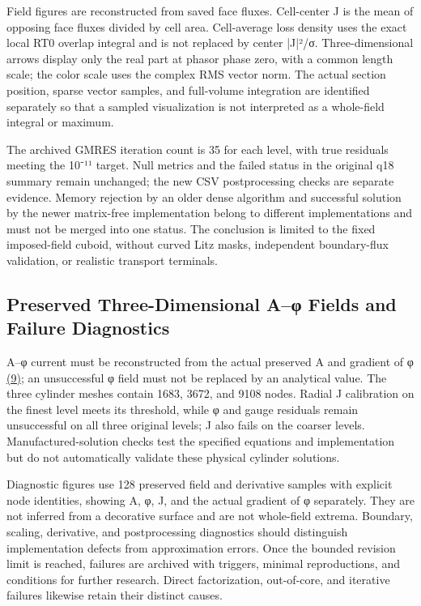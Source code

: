 \documentclass[journal,10pt]{IEEEtran}
\begin{document}
Field figures are reconstructed from saved face fluxes. Cell-center J is the mean of opposing face fluxes divided by cell area. Cell-average loss density uses the exact local RT0 overlap integral and is not replaced by center |J|²/σ. Three-dimensional arrows display only the real part at phasor phase zero, with a common length scale; the color scale uses the complex RMS vector norm. The actual section position, sparse vector samples, and full-volume integration are identified separately so that a sampled visualization is not interpreted as a whole-field integral or maximum.


The archived GMRES iteration count is 35 for each level, with true residuals meeting the 10⁻¹¹ target. Null metrics and the failed status in the original q18 summary remain unchanged; the new CSV postprocessing checks are separate evidence. Memory rejection by an older dense algorithm and successful solution by the newer matrix-free implementation belong to different implementations and must not be merged into one status. The conclusion is limited to the fixed imposed-field cuboid, without curved Litz masks, independent boundary-flux validation, or realistic transport terminals.


\subsection*{Preserved Three-Dimensional A–φ Fields and Failure Diagnostics}
\hypertarget{S2.aphi.heading}{}
A–φ current must be reconstructed from the actual preserved A and gradient of φ \href{paper_en_ieee.pdf#E07}{(9)}; an unsuccessful φ field must not be replaced by an analytical value. The three cylinder meshes contain 1683, 3672, and 9108 nodes. Radial J calibration on the finest level meets its threshold, while φ and gauge residuals remain unsuccessful on all three original levels; J also fails on the coarser levels. Manufactured-solution checks test the specified equations and implementation but do not automatically validate these physical cylinder solutions.


Diagnostic figures use 128 preserved field and derivative samples with explicit node identities, showing A, φ, J, and the actual gradient of φ separately. They are not inferred from a decorative surface and are not whole-field extrema. Boundary, scaling, derivative, and postprocessing diagnostics should distinguish implementation defects from approximation errors. Once the bounded revision limit is reached, failures are archived with triggers, minimal reproductions, and conditions for further research. Direct factorization, out-of-core, and iterative failures likewise retain their distinct causes.
\end{document}

